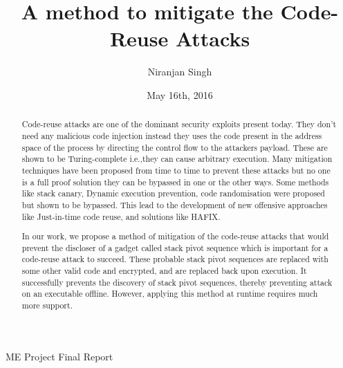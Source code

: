 \documentclass{article}
\title{\large \bf A method to mitigate the Code-Reuse Attacks }
\author{Niranjan Singh}
\date{May 16th, 2016}
\begin{document}
	\maketitle
    \begin{center}
        ME Project Final Report
    \end{center}
        \vskip 12pt
	\thispagestyle{empty}
	
	
		\begin{abstract}
		Code-reuse attacks are one of the dominant security exploits present today. They don't need any malicious code injection instead they uses the code present in the address space of the process by directing the control flow to the attackers payload. These are shown to be Turing-complete i.e.,they can cause arbitrary execution. Many mitigation techniques have been proposed from time to time to prevent these attacks but no one is a full proof solution they can be bypassed in one or the other ways. Some methods like stack canary, Dynamic execution prevention, code randomisation were proposed but shown to be bypassed. This lead to the development of new offensive approaches like Just-in-time code reuse, and solutions like HAFIX.
		
		In our work, we propose a method of mitigation of the code-reuse attacks that would prevent the discloser of a gadget called stack pivot sequence which is important for a code-reuse attack to succeed. These probable stack pivot sequences are replaced with some other valid code and encrypted, and are replaced back upon execution. It successfully prevents the discovery of stack pivot sequences, thereby preventing attack on an executable offline. However, applying this method at runtime requires much more support.
	\end{abstract}	
	
	\hfill \\
	
\end{document}
